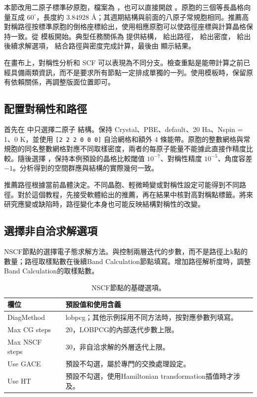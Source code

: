 本節改用二原子標準矽原胞，檔案為 ，也可以直接開啟 。原胞的三個等長晶格向量互成 $60^\circ$，長度約 $3.84928$ Å；其週期結構與前面的八原子常規胞相同。推薦高對稱路徑按標準原胞的倒格座標給出，使用相應原胞可以使路徑座標與計算晶格保持一致。從  模板開始。典型任務關係為  提供結構， 給出路徑， 給出密度， 給出後續求解選項， 結合路徑與密度完成計算，最後由  顯示結果。

在畫布上，對稱性分析和 SCF 可以表現為不同分支。檢查重點是能帶計算之前已經具備兩類資訊，而不是要求所有節點一定排成單獨的一列。使用模板時，保留原有依賴關係，再調整版面位置即可。


\subsection{配置對稱性和路徑}

首先在  中只選擇二原子  結構。保持 Crystal、PBE、default、20 Ha、Nspin = 1、0 K，並使用 \mbox{\texttt{[2 2 2 0 0 0]}} 自洽網格和額外 4 條能帶。原胞的整數網格與常規胞的同名整數網格對應不同取樣密度，兩者的每原子能量不能據此直接作精度比較。隨後選擇 ，保持本例預設的晶格比較閾值 $10^{-7}$、對稱性精度 $10^{-5}$、角度容差 $-1$。分析得到的空間群應與結構的實際幾何一致。

推薦路徑根據當前晶體決定。不同晶胞、輕微畸變或對稱性設定可能得到不同路徑。對於這個教程，先接受軟體給出的推薦，再在結果中核對高對稱點標籤。將來研究應變或缺陷時，路徑變化本身也可能反映結構對稱性的改變。

\subsection{選擇非自洽求解選項}

NSCF節點的選擇電子態求解方法。與控制兩層迭代的步數，而不是路徑上k點的數量；路徑取樣點數在後續Band Calculation節點填寫。增加路徑解析度時，調整Band Calculation的取樣點數。

\begin{table}[htbp]
\centering
\caption{NSCF節點的基礎選項。}
\begin{tabularx}{\linewidth}{lX}
\toprule
欄位 & 預設值和使用含義 \\
\midrule
DiagMethod & lobpcg；其他示例採用不同方法時，按對應參數列填寫。 \\
Max CG steps & 20，LOBPCG的內部迭代步數上限。 \\
Max NSCF steps & 30，非自洽求解的外層迭代上限。 \\
Use GACE & 預設不勾選，屬於專門的交換處理設定。 \\
Use HT & 預設不勾選，使用Hamiltonian transformation插值時才涉及。 \\
\bottomrule
\end{tabularx}
\end{table}

